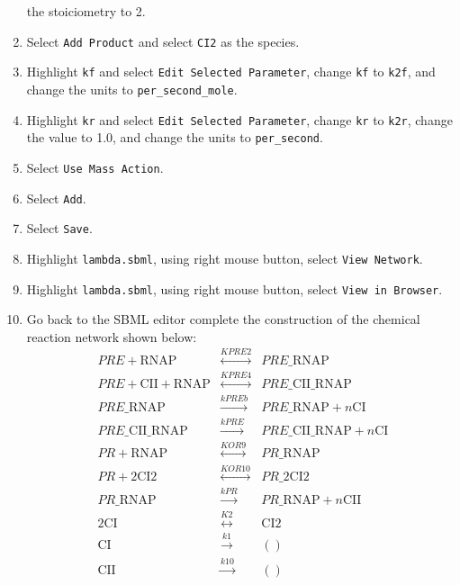 \documentclass[titlepage,11pt]{article}
\begin{document}
\begin{enumerate}
      the stoiciometry to 2.
\item Select {\tt Add Product} and select {\tt CI2} as the species.
\item Highlight {\tt kf} and select {\tt Edit Selected Parameter}, change
      {\tt kf} to {\tt k2f}, and change the units to {\tt per\_second\_mole}.
\item Highlight {\tt kr} and select {\tt Edit Selected Parameter}, change
      {\tt kr} to {\tt k2r}, change the value to 1.0, and change 
      the units to {\tt per\_second}.
\item Select {\tt Use Mass Action}.
\item Select {\tt Add}.
\item Select {\tt Save}.
\item Highlight {\tt lambda.sbml}, using right mouse button, select 
      {\tt View Network}.
\item Highlight {\tt lambda.sbml}, using right mouse button, select 
      {\tt View in Browser}.
\item Go back to the SBML editor complete the construction of the
      chemical reaction network shown below:
\begin{eqnarray*}
PRE + \mathrm{RNAP} & \stackrel{KPRE2}{\longleftrightarrow} &
PRE\_\mathrm{RNAP} \\
PRE + \mathrm{CII} + \mathrm{RNAP} &
\stackrel{KPRE4}{\longleftrightarrow} &
PRE\_\mathrm{CII}\_\mathrm{RNAP} \\
PRE\_\mathrm{RNAP} & \stackrel{kPREb}{\longrightarrow} & 
PRE\_\mathrm{RNAP} + n\mathrm{CI} \\
PRE\_\mathrm{CII}\_\mathrm{RNAP} 
& \stackrel{kPRE}{\longrightarrow} & 
PRE\_\mathrm{CII}\_\mathrm{RNAP} + n\mathrm{CI} \\
PR + \mathrm{RNAP} & \stackrel{KOR9}{\longleftrightarrow} &
PR\_\mathrm{RNAP} \\
PR + 2 \mathrm{CI2} & \stackrel{KOR10}{\longleftrightarrow} &
PR\_2 \mathrm{CI2} \\
PR\_\mathrm{RNAP} & \stackrel{kPR}{\longrightarrow} & 
PR\_\mathrm{RNAP} + n\mathrm{CII} \\
2 \mathrm{CI} & \stackrel{K2}{\longleftrightarrow} & \mathrm{CI2} \\
\mathrm{CI} & \stackrel{k1}{\longrightarrow} & () \\ 
\mathrm{CII} & \stackrel{k10}{\longrightarrow} & ()
\end{eqnarray*}


\end{enumerate}
\end{document}
